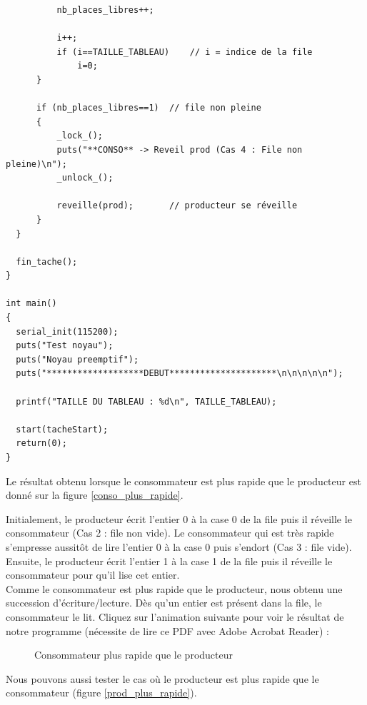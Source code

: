 \documentclass[a4paper,12pt]{report}
\begin{document}
\begin{lstlisting}
		  nb_places_libres++;

		  i++;
		  if (i==TAILLE_TABLEAU)	// i = indice de la file
			  i=0;
	  }

	  if (nb_places_libres==1)	// file non pleine
	  {
		  _lock_();
		  puts("**CONSO** -> Reveil prod (Cas 4 : File non pleine)\n");
		  _unlock_();

		  reveille(prod);		// producteur se réveille
	  }
  }

  fin_tache();
}

int main()
{
  serial_init(115200);
  puts("Test noyau");
  puts("Noyau preemptif");
  puts("*******************DEBUT*********************\n\n\n\n\n");

  printf("TAILLE DU TABLEAU : %d\n", TAILLE_TABLEAU);

  start(tacheStart);
  return(0);
}
\end{lstlisting}

Le résultat obtenu lorsque le consommateur est plus rapide que le producteur est donné sur la figure \ref{conso_plus_rapide}.\newline

Initialement, le producteur écrit l'entier 0 à la case 0 de la file puis il réveille le consommateur (Cas 2 : file non vide). Le consommateur qui est très rapide s'empresse aussitôt de lire l'entier 0 à la case 0 puis s'endort (Cas 3 : file vide). Ensuite, le producteur écrit l'entier 1 à la case 1 de la file puis il réveille le consommateur pour qu'il lise cet entier.\\
Comme le consommateur est plus rapide que le producteur, nous obtenu une succession d'écriture/lecture. Dès qu'un entier est présent dans la file, le consommateur le lit. Cliquez sur l'animation suivante pour voir le résultat de notre programme (nécessite de lire ce PDF avec Adobe Acrobat Reader) :

\begin{figure}[h]
	  \centering
		\caption{Consommateur plus rapide que le producteur}
		\label{anim_conso_plus_rapide}
\end{figure}

\newpage

Nous pouvons aussi tester le cas où le producteur est plus rapide que le consommateur (figure \ref{prod_plus_rapide}).\newline
\end{document}
